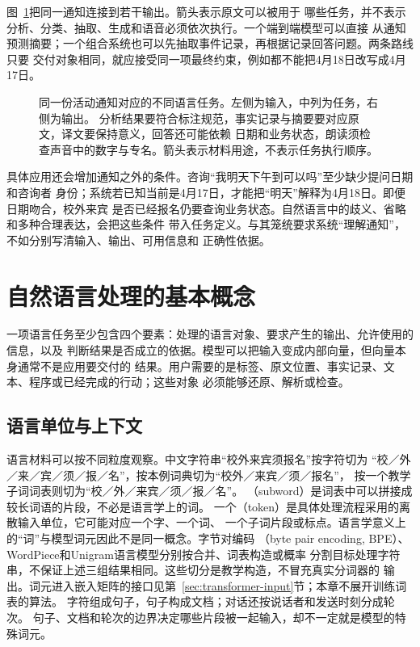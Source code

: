 图~\ref{fig:nlp-one-text-many-tasks}把同一通知连接到若干输出。箭头表示原文可以被用于
哪些任务，并不表示分析、分类、抽取、生成和语音必须依次执行。一个端到端模型可以直接
从通知预测摘要；一个组合系统也可以先抽取事件记录，再根据记录回答问题。两条路线只要
交付对象相同，就应接受同一项最终约束，例如都不能把4月18日改写成4月17日。

\begin{figure}[htbp]
  \centering
  
  \caption{同一份活动通知对应的不同语言任务。左侧为输入，中列为任务，右侧为输出。
  分析结果要符合标注规范，事实记录与摘要要对应原文，译文要保持意义，回答还可能依赖
  日期和业务状态，朗读须检查声音中的数字与专名。箭头表示材料用途，不表示任务执行顺序。}
  \label{fig:nlp-one-text-many-tasks}
\end{figure}

具体应用还会增加通知之外的条件。咨询“我明天下午到可以吗”至少缺少提问日期和咨询者
身份；系统若已知当前是4月17日，才能把“明天”解释为4月18日。即便日期吻合，校外来宾
是否已经报名仍要查询业务状态。自然语言中的歧义、省略和多种合理表达，会把这些条件
带入任务定义。与其笼统要求系统“理解通知”，不如分别写清输入、输出、可用信息和
正确性依据。

\FloatBarrier
\section{自然语言处理的基本概念}
\label{sec:nlp-basic-concepts}

一项语言任务至少包含四个要素：处理的语言对象、要求产生的输出、允许使用的信息，以及
判断结果是否成立的依据。模型可以把输入变成内部向量，但向量本身通常不是应用要交付的
结果。用户需要的是标签、原文位置、事实记录、文本、程序或已经完成的行动；这些对象
必须能够还原、解析或检查。

\subsection{语言单位与上下文}
\label{sec:nlp-units-and-context}

语言材料可以按不同粒度观察。中文字符串“校外来宾须报名”按字符切为
“校／外／来／宾／须／报／名”，按本例词典切为“校外／来宾／须／报名”，
按一个教学子词词表则切为“校／外／来宾／须／报／名”。
（subword）是词表中可以拼接成较长词语的片段，不必是语言学上的词。
一个（token）是具体处理流程采用的离散输入单位，它可能对应一个字、一个词、
一个子词片段或标点。语言学意义上的“词”与模型词元因此不是同一概念。字节对编码
（byte pair encoding, BPE）、WordPiece和Unigram语言模型分别按合并、词表构造或概率
分割目标处理字符串，不保证上述三组结果相同。这些切分是教学构造，不冒充真实分词器的
输出。词元进入嵌入矩阵的接口见第~\ref{sec:transformer-input}节；本章不展开训练词表的算法。
字符组成句子，句子构成文档；对话还按说话者和发送时刻分成轮次。
句子、文档和轮次的边界决定哪些片段被一起输入，却不一定就是模型的特殊词元。

